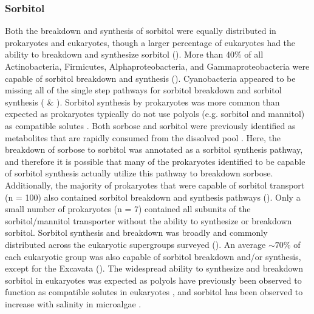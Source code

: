\documentclass[utf8]{frontiersSCNS} %
\begin{document}
\subsubsection*{Sorbitol}
Both the breakdown and synthesis of sorbitol were equally distributed in prokaryotes and eukaryotes, though a larger percentage of eukaryotes had the ability to breakdown and synthesize sorbitol (). More than 40\% of all Actinobacteria, Firmicutes, Alphaproteobacteria, and Gammaproteobacteria were capable of sorbitol breakdown and synthesis (). Cyanobacteria appeared to be missing all of the single step pathways for sorbitol breakdown and sorbitol synthesis ( \& ). Sorbitol synthesis by prokaryotes was more common than expected as prokaryotes typically do not use polyols (e.g. sorbitol and mannitol) as compatible solutes \citep{Kinne1993,Empadinhas2008}. Both sorbose and sorbitol were previously identified as metabolites that are rapidly consumed from the dissolved pool \citep{Vorobev2018}. Here, the breakdown of sorbose to sorbitol was annotated as a sorbitol synthesis pathway, and therefore it is possible that many of the prokaryotes identified to be capable of sorbitol synthesis actually utilize this pathway to breakdown sorbose. Additionally, the majority of prokaryotes that were capable of sorbitol transport (n = 100) also contained sorbitol breakdown and synthesis pathways (). Only a small number of prokaryotes (n = 7) contained all subunits of the sorbitol/mannitol transporter without the ability to synthesize or breakdown sorbitol.  Sorbitol synthesis and breakdown was broadly and commonly distributed across the eukaryotic supergroups surveyed (). An average $\sim 70\%$ of each eukaryotic group was also capable of sorbitol breakdown and/or synthesis, except for the Excavata (). The widespread ability to synthesize and breakdown sorbitol in eukaryotes was expected as polyols have previously been observed to function as compatible solutes in eukaryotes \citep{Burg2008}, and sorbitol has been observed to increase with salinity in microalgae \citep{Brown1978}. 
\end{document}
